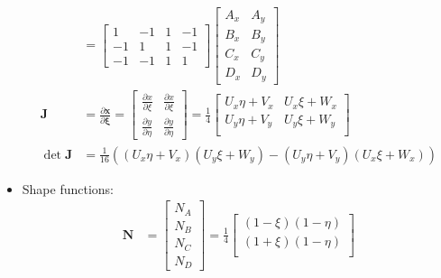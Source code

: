 \documentclass[10pt]{article}
\begin{document}
\begin{itemize}
\begin{align}
            &=
            \begin{bmatrix}
                1 & -1 & 1 & -1 \\
                -1 & 1 & 1 & -1 \\
                -1 & -1 & 1 & 1
            \end{bmatrix}
            \begin{bmatrix}
                A_x & A_y \\
                B_x & B_y \\
                C_x & C_y \\
                D_x & D_y
            \end{bmatrix}
            \\
            \mathbf{J} &= \frac{\partial \mathbf{x}}{\partial \boldsymbol{\xi}}
            =
            \begin{bmatrix}
                \frac{\partial x}{\partial \xi} & \frac{\partial x}{\partial \xi} \\
                \frac{\partial y}{\partial \eta} & \frac{\partial y}{\partial \eta}
            \end{bmatrix}
            =
            \frac{1}{4}
            \begin{bmatrix}
                U_x \eta + V_x & U_x \xi + W_x \\
                U_y \eta + V_y & U_y \xi + W_y \\
            \end{bmatrix} \\
            \det \mathbf{J}
            &=
            \frac{1}{16} ({\left(U_{x} \eta + V_{x}\right)} {\left(U_{y} \xi + W_{y}\right)}
                - {\left(U_{y} \eta + V_{y}\right)} {\left(U_{x} \xi + W_{x}\right)})
        \end{align}
    \item Shape functions:
        \begin{align}
            \mathbf{N}
            &=
            \begin{bmatrix}
                N_A \\
                N_B \\
                N_C \\
                N_D
            \end{bmatrix}
            =
            \frac{1}{4}
            \begin{bmatrix}
                (1 - \xi)(1 - \eta) \\
                (1 + \xi)(1 - \eta) \\

\end{bmatrix}
\end{align}
\end{itemize}
\end{document}
